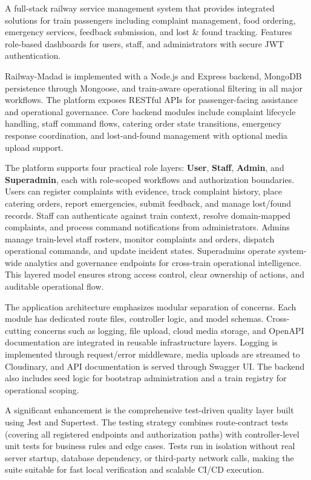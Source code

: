 \documentclass[12pt,a4paper]{report}
\begin{document}
A full-stack railway service management system that provides integrated solutions for train passengers including complaint management, food ordering, emergency services, feedback submission, and lost \& found tracking. Features role-based dashboards for users, staff, and administrators with secure JWT authentication.

Railway-Madad is implemented with a Node.js and Express backend, MongoDB persistence through Mongoose, and train-aware operational filtering in all major workflows. The platform exposes RESTful APIs for passenger-facing assistance and operational governance. Core backend modules include complaint lifecycle handling, staff command flows, catering order state transitions, emergency response coordination, and lost-and-found management with optional media upload support.

The platform supports four practical role layers: \textbf{User}, \textbf{Staff}, \textbf{Admin}, and \textbf{Superadmin}, each with role-scoped workflows and authorization boundaries. Users can register complaints with evidence, track complaint history, place catering orders, report emergencies, submit feedback, and manage lost/found records. Staff can authenticate against train context, resolve domain-mapped complaints, and process command notifications from administrators. Admins manage train-level staff rosters, monitor complaints and orders, dispatch operational commands, and update incident states. Superadmins operate system-wide analytics and governance endpoints for cross-train operational intelligence. This layered model ensures strong access control, clear ownership of actions, and auditable operational flow.

The application architecture emphasizes modular separation of concerns. Each module has dedicated route files, controller logic, and model schemas. Cross-cutting concerns such as logging, file upload, cloud media storage, and OpenAPI documentation are integrated in reusable infrastructure layers. Logging is implemented through request/error middleware, media uploads are streamed to Cloudinary, and API documentation is served through Swagger UI. The backend also includes seed logic for bootstrap administration and a train registry for operational scoping.

A significant enhancement is the comprehensive test-driven quality layer built using Jest and Supertest. The testing strategy combines route-contract tests (covering all registered endpoints and authorization paths) with controller-level unit tests for business rules and edge cases. Tests run in isolation without real server startup, database dependency, or third-party network calls, making the suite suitable for fast local verification and scalable CI/CD execution.
\end{document}
